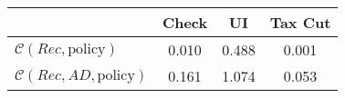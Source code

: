\begin{tabular}{@{}lccc@{}}
\toprule
                          & Check      & UI    & Tax Cut    \\  \midrule
$\mathcal{C}(Rec,\text{policy})$ & 0.010  & 0.488  & 0.001     \\
$\mathcal{C}(Rec, AD,\text{policy})$ & 0.161  & 1.074  & 0.053     \\
\end{tabular}
